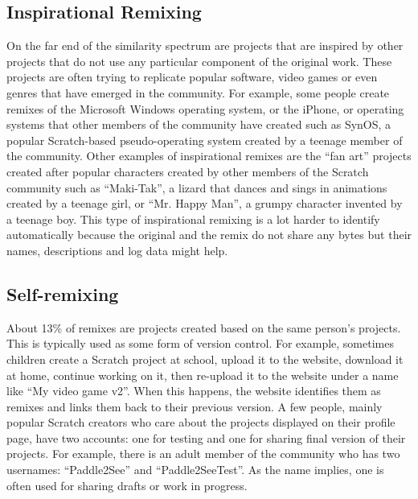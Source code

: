 \subsection{Inspirational Remixing}
On the far end of the similarity spectrum are projects that are inspired by other projects that do not use any particular component of the original work.
These projects are often trying to replicate popular software, video games or even genres that have emerged in the community.
For example, some people create remixes of the Microsoft Windows operating system, or the iPhone, or operating systems that other members of the community have created such as SynOS, a popular Scratch-based pseudo-operating system created by a teenage member of the community.
Other examples of inspirational remixes are the ``fan art'' projects created after popular characters created by other members of the Scratch community such as ``Maki-Tak'', a lizard that dances and sings in animations created by a teenage girl,  or  ``Mr. Happy Man'', a grumpy character invented by a teenage boy.
This type of inspirational remixing is a lot harder to identify automatically because the original and the remix do not share any bytes but their names, descriptions and log data might help. 

\subsection{Self-remixing}
About 13\% of remixes are projects created based on the same person's projects.
This is typically used as some form of version control.
For example, sometimes children create a Scratch project at school, upload it to the website, download it at home, continue working on it, then re-upload it to the website under a name like ``My video game v2''.
When this happens, the website identifies them as remixes and links them back to their previous version.
A few people, mainly popular Scratch creators who care about the projects displayed on their profile page, have two accounts: one for testing and one for sharing final version of their projects.
For example, there is an adult member of the community who has two usernames: ``Paddle2See'' and ``Paddle2SeeTest''.
As the name implies, one is often used for sharing drafts or work in progress.
 
